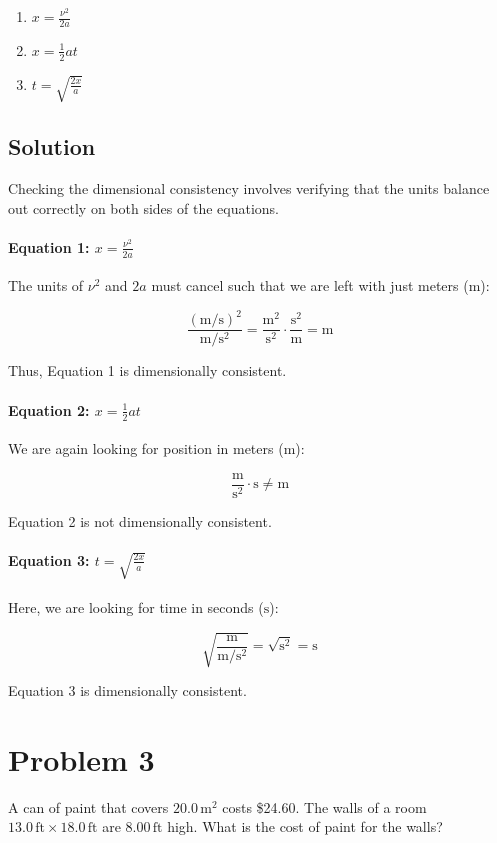 \documentclass{article}
\newcommand{\meter}{\text{m}}
\newcommand{\second}{\text{s}}
\newcommand{\foot}{\text{ft}}
\begin{document}
\begin{enumerate}
    \item \( x = \frac{\nu^2}{2a} \)
    \item \( x = \frac{1}{2}at \)
    \item \( t = \sqrt{\frac{2x}{a}} \)
\end{enumerate}

\subsection*{Solution}
Checking the dimensional consistency involves verifying that the units balance out correctly on both sides of the equations.

\paragraph{Equation 1: \( x = \frac{\nu^2}{2a} \)}

The units of \( \nu^2 \) and \( 2a \) must cancel such that we are left with just meters (\(\meter\)):

\[
\frac{\left( \meter/\second \right)^2}{\meter/\second^2} = \frac{\meter^2}{\second^2} \cdot \frac{\second^2}{\meter} = \meter
\]

Thus, Equation 1 is dimensionally consistent.

\paragraph{Equation 2: \( x = \frac{1}{2}at \)}

We are again looking for position in meters (\(\meter\)):

\[
\frac{\meter}{\second^2} \cdot \second \neq \meter
\]

Equation 2 is not dimensionally consistent.

\paragraph{Equation 3: \( t = \sqrt{\frac{2x}{a}} \)}

Here, we are looking for time in seconds (\(\second\)):

\[
\sqrt{\frac{\meter}{\meter/\second^2}} = \sqrt{\second^2} = \second
\]

Equation 3 is dimensionally consistent.

\section*{Problem 3}
A can of paint that covers \(20.0 \, \si{\meter^2}\) costs \$24.60. The walls of a room \(13.0 \, \si{\foot} \times 18.0 \, \si{\foot}\) are \(8.00 \, \si{\foot}\) high. What is the cost of paint for the walls?
\end{document}
